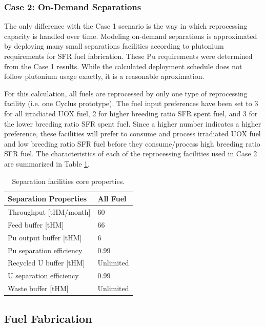 \documentclass[12pt]{article}
\begin{document}
\subsubsection{Case 2: On-Demand Separations}
\label{sec:case2}

The only difference with the Case 1 scenario is the way in
which reprocessing capacity is handled over time.  Modeling on-demand
separations is approximated by deploying many small separations facilities according to plutonium
requirements for SFR fuel fabrication.  These Pu requirements were determined
from the Case 1 results. While the calculated deployment schedule does not
follow plutonium usage exactly, it is a reasonable aproximation. 

For this calculation, all fuels are reprocessed by only one type of
reprocessing facility (i.e. one Cyclus prototype). The fuel input preferences
have been set to 3 for all irradiated UOX fuel, 2 for higher breeding ratio
SFR spent fuel, and 3 for the lower breeding ratio SFR spent fuel.  Since a higher
number indicates a higher preference, these facilities will prefer to consume and process
irradiated UOX fuel and low breeding ratio SFR fuel before they consume/process 
high breeding ratio SFR fuel.  The characteristics of each of the
reprocessing facilities used in Case 2 are summarized in Table
\ref{tab:fuelfab_2}.

\begin{table}[h!]
    \centering
    \begin{tabular}{ll}
    \hline
    Separation Properties     &  All Fuel   \\
    \hline
    Throughput [tHM/month]    &  60         \\
    Feed buffer [tHM]         &  66         \\
    Pu output buffer  [tHM]   &  6          \\
    Pu separation efficiency  &  0.99       \\
    Recycled U buffer [tHM]   &  Unlimited  \\
    U separation efficiency   &  0.99       \\
    Waste buffer [tHM]        &  Unlimited  \\
    \hline
    \end{tabular}
    \caption{Separation facilities core properties.}
    \label{tab:fuelfab_2}
\end{table}

\subsection{Fuel Fabrication}
\end{document}
